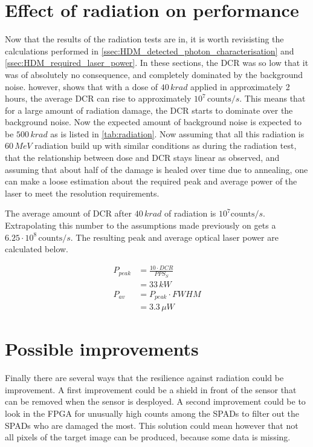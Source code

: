 \section{Effect of radiation on performance}\label{ssec:effect_on_performance}
Now that the results of the radiation tests are in, it is worth revisisting the calculations performed in \cref{ssec:HDM_detected_photon_characterisation} and \cref{ssec:HDM_required_laser_power}.
In these sections, the DCR was so low that it was of absolutely no consequence, and completely dominated by the background noise.  however, shows that with a dose of $40\,krad$ applied in approximately 2 hours, the average DCR can rise to approximately $10^{7}\,\text{counts}/s$. 
This means that for a large amount of radiation damage, the DCR starts to dominate over the background noise. Now the expected amount of background noise is expected to be $500\,krad$ as is listed in \cref{tab:radiation}. Now assuming that all this radiation is $60\,MeV$ radiation build up with similar conditions as during the radiation test, that the relationship between dose and DCR stays linear as observed, and assuming that about half of the damage is healed over time due to annealing, one can make a loose estimation about the required peak and average power of the laser to meet the resolution requirements.

The average amount of DCR after $40\,krad$ of radiation is $10^{7}\text{counts}/s$. Extrapolating this number to the assumptions made previously on gets a $6.25\cdot10^8\,\text{counts}/s$. The resulting peak and average optical laser power are calculated below.

\begin{align*}
	P_{peak}&= \frac{10\cdot DCR}{PPS_S}\\
	&= 33\,kW\\
	P_{av} &= P_{peak}\cdot FWHM\\
	&= 3.3\,\mu W
\end{align*}

\section{Possible improvements}\label{ssec:possible_improvements}
Finally there are several ways that the resilience against radiation could be improvement. A first improvement could be a shield in front of the sensor that can be removed when the sensor is desployed. A second improvement could be to look in the FPGA for unusually high counts among the SPADs to filter out the SPADs who are damaged the most. This solution could mean however that not all pixels of the target image can be produced, because some data is missing. 
